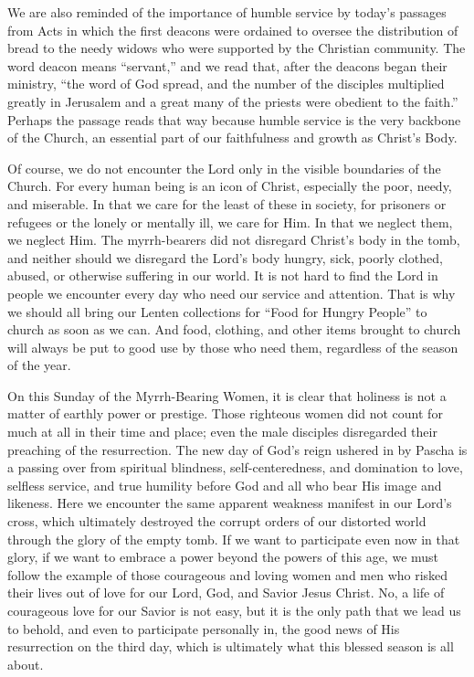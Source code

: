 \documentclass[twoside, letterpaper, 12pt]{report}
\begin{document}
\begin{maybetwocolumns}
We are also reminded of the importance of humble service by today’s passages from Acts in which
the first deacons were ordained to oversee the distribution of bread to the needy widows who were
supported by the Christian community. The word deacon means “servant,” and we read that, after
the deacons began their ministry, “the word of God spread, and the number of the disciples
multiplied greatly in Jerusalem and a great many of the priests were obedient to the faith.” Perhaps
the passage reads that way because humble service is the very backbone of the Church, an essential
part of our faithfulness and growth as Christ’s Body.

Of course, we do not encounter the Lord only in the visible boundaries of the Church. For every
human being is an icon of Christ, especially the poor, needy, and miserable. In that we care for
the least of these in society, for prisoners or refugees or the lonely or mentally ill, we care for Him.
In that we neglect them, we neglect Him. The myrrh-bearers did not disregard Christ’s body in
the tomb, and neither should we disregard the Lord’s body hungry, sick, poorly clothed, abused,
or otherwise suffering in our world. It is not hard to find the Lord in people we encounter every
day who need our service and attention. That is why we should all bring our Lenten collections for
“Food for Hungry People” to church as soon as we can. And food, clothing, and other items
brought to church will always be put to good use by those who need them, regardless of the season
of the year.

On this Sunday of the Myrrh-Bearing Women, it is clear that holiness is not a matter of earthly
power or prestige. Those righteous women did not count for much at all in their time and place;
even the male disciples disregarded their preaching of the resurrection. The new day of God’s
reign ushered in by Pascha is a passing over from spiritual blindness, self-centeredness, and
domination to love, selfless service, and true humility before God and all who bear His image and
likeness. Here we encounter the same apparent weakness manifest in our Lord’s cross, which
ultimately destroyed the corrupt orders of our distorted world through the glory of the empty tomb.
If we want to participate even now in that glory, if we want to embrace a power beyond the powers
of this age, we must follow the example of those courageous and loving women and men who
risked their lives out of love for our Lord, God, and Savior Jesus Christ. No, a life of courageous
love for our Savior is not easy, but it is the only path that we lead us to behold, and even to
participate personally in, the good news of His resurrection on the third day, which is ultimately
what this blessed season is all about.

\end{maybetwocolumns}
\end{document}
